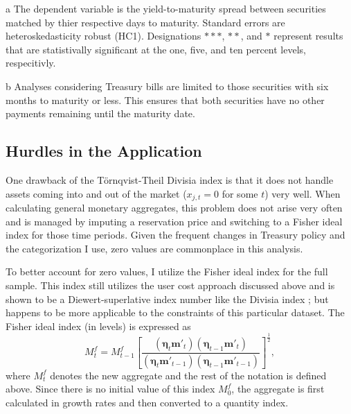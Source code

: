 \documentclass[11pt,a4paper,margin=1.5in]{article}
\begin{document}
\begin{table}[h]
\begin{threeparttable}
\begin{tabular}{l d{2.4} d{2.4} d{2.4}}
		\end{tabular}
		\begin{tablenotes}
			\item[a] \footnotesize{The dependent variable is the yield-to-maturity spread between securities matched by thier respective days to maturity. Standard errors are heteroskedasticity robust (HC1). Designations $***$, $**$, and $*$ represent results that are statistivally significant at the one, five, and ten percent levels, respecitivly.}
			\item[b] \footnotesize{Analyses considering Treasury bills are limited to those securities with six months to maturity or less. This ensures that both securities have no other payments remaining until the maturity date.}
		\end{tablenotes}
	\end{threeparttable}
\end{table}




\subsection{Hurdles in the Application}
\label{subsec:Hurdles}
One drawback of the T\"{o}rnqvist-Theil Divisia index is that it does not handle assets coming into and out of the market ($x_{j,t} = 0$ for some $t$) very well.
When calculating general monetary aggregates, this problem does not arise very often and is managed by imputing a reservation price and switching to a Fisher ideal index for those time periods.
Given the frequent changes in Treasury policy and the categorization I use, zero values are commonplace in this analysis.

To better account for zero values, I utilize the Fisher ideal index for the full sample.
This index still utilizes the user cost approach discussed above and is shown to be a Diewert-superlative index number like the Divisia index \citep{Diewert:1976}; but happens to be more applicable to the constraints of this particular dataset.
The Fisher ideal index (in levels) is expressed as
	\begin{equation}
		M^f_t = M^f_{t-1}\left[\frac{(\boldsymbol \eta_t \mathbf{m'}_t) (\boldsymbol \eta_{t-1} \mathbf{m'}_t)}{(\boldsymbol \eta_t \mathbf{m'}_{t-1}) (\boldsymbol \eta_{t-1} \mathbf{m'}_{t-1})}\right]^{\frac{1}{2}},
		\label{eq:FisherIdeal}
	\end{equation}
where $M^f_t$ denotes the new aggregate and the rest of the notation is defined above.
Since there is no initial value of this index $M^f_0$, the aggregate is first calculated in growth rates and then converted to a quantity index. 
\end{document}
